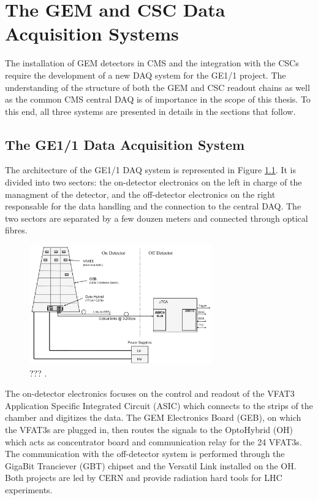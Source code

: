 \chapter{The GEM and CSC Data Acquisition Systems}
\label{chap:II-2-daq}

  The installation of GEM detectors in CMS and the integration with the CSCs require the development of a new DAQ system for the GE1/1 project. The understanding of the structure of both the GEM and CSC readout chains as well as the common CMS central DAQ is of importance in the scope of this thesis. To this end, all three systems are presented in details in the sections that follow. \\

  \section{The GE1/1 Data Acquisition System}

    The architecture of the GE1/1 DAQ system is represented in Figure \ref{fig:II-2-daq-gem-system}. It is divided into two sectors: the on-detector electronics on the left in charge of the managment of the detector, and the off-detector electronics on the right responsable for the data handling and the connection to the central DAQ. The two sectors are separated by a few douzen meters and connected through optical fibres. \\

    \begin{figure}[h!]
      \centering
      \includegraphics[width=0.7\textwidth]{img/II-2-daq/gem-system.pdf}
      \caption{??? \cite{Colaleo:2021453}.}
      \label{fig:II-2-daq-gem-system}
    \end{figure}

    The on-detector electronics focuses on the control and readout of the VFAT3 Application Specific Integrated Circuit (ASIC) which connects to the strips of the chamber and digitizes the data. The GEM Electronics Board (GEB), on which the VFAT3s are plugged in, then routes the signals to the OptoHybrid (OH) which acts as concentrator board and communication relay for the 24 VFAT3s. The communication with the off-detector system is performed through the GigaBit Tranciever (GBT) chipset and the Versatil Link installed on the OH. Both projects are led by CERN and provide radiation hard tools for LHC experiments. \\

